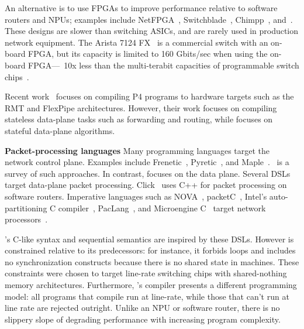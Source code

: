 An alternative is to use FPGAs to improve performance relative to software
routers and NPUs; examples include NetFPGA~\cite{netfpga},
Switchblade~\cite{switchblade}, Chimpp~\cite{chimpp}, and~\cite{silver_bullet}.
These designs are slower than switching ASICs, and are rarely used in
production network equipment. The Arista 7124 FX~\cite{7124fx} is a commercial
switch with an on-board FPGA, but its capacity is limited to 160 Gbits/sec when
using the on-board FPGA---~10x less than the multi-terabit capacities of
programmable switch chips~\cite{xpliant}.

Recent work~\cite{lavanya_compiler} focuses on compiling P4 programs to
hardware targets such as the RMT and FlexPipe architectures. However, their
work focuses on compiling stateless data-plane tasks such as forwarding and
routing, while \pktlanguage focuses on stateful data-plane algorithms.

\textbf{Packet-processing languages}
Many programming languages target the network control plane. Examples include
Frenetic~\cite{frenetic}, Pyretic~\cite{pyretic}, and
Maple~\cite{maple}.~\cite{language_survey} is a survey of such approaches.  In
contrast, \pktlanguage focuses on the data plane. Several DSLs target data-plane
packet processing. Click~\cite{click} uses C++ for packet
processing on software routers. Imperative languages such as NOVA~\cite{nova},
packetC~\cite{packetc}, Intel's auto-partitioning C
compiler~\cite{intel_uiuc_pldi}, PacLang~\cite{paclang_lang,
paclang_partitioner}, and Microengine C~\cite{microenginec, intel_ixa} target
network processors~\cite{ixp2800, ixp4xx}.

\pktlanguage's C-like syntax and sequential semantics are inspired by these
DSLs. However \pktlanguage is constrained relative to its predecessors: for
instance, it forbids loops and includes no synchronization constructs because
there is no shared state in \absmachine machines. These constraints were chosen
to target line-rate switching chips with shared-nothing memory architectures.
Furthermore, \pktlanguage's compiler presents a different programming model:
all \pktlanguage programs that compile run at line-rate, while those that can't
run at line rate are rejected outright. Unlike an NPU or software router, there
is no slippery slope of degrading performance with increasing program
complexity.

